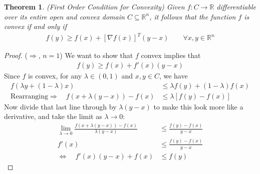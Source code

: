 \documentclass[12pt]{book}
\numberwithin{equation}{section} %
\theoremstyle{plain}
\newtheorem{thm}{Theorem}[section]
\theoremstyle{definition}
\theoremstyle{remark}
\newcommand{\R}{\mathbb{R}}
\newcommand{\Rn}{\mathbb{R}^n}
\begin{document}
\begin{thm}{\emph{(First Order Condition for Convexity)}}
\label{thm:diffconvex}
Given $f:C\rightarrow \R$ differentiable over its entire open and convex
domain $C\subseteq\Rn$, it follows that the function $f$ is convex if
and only if
\begin{align*}
  f(y) \geq f(x) + [\nabla f(x)]^T (y-x)
  \qquad\forall x,y\in\Rn
\end{align*}
\end{thm}
\begin{proof}
($\Rightarrow$, $n=1$) We want to show that $f$ convex implies that
\begin{align*}
  f(y) \geq f(x) + f'(x)(y-x)
\end{align*}
Since $f$ is convex, for any $\lambda\in(0,1)$ and $x,y\in C$, we have
\begin{align*}
  f(\lambda y + (1-\lambda)x)
  &\leq
  \lambda f(y) + (1-\lambda)f(x) \\
  \text{Rearranging} \Rightarrow \quad
  f(x + \lambda (y -x))
  - f(x)
  &\leq
  \lambda \left[f(y) - f(x) \right]
\end{align*}
Now divide that last line through by $\lambda(y-x)$ to make this look
more like a derivative, and take the limit as $\lambda\rightarrow 0$:
\begin{align*}
  \lim_{\lambda\rightarrow 0}
  \frac{f(x + \lambda (y -x)) - f(x)}{\lambda(y-x)}
  &\leq
  \frac{f(y) - f(x)}{y-x} \\
  f'(x)
  &\leq
  \frac{f(y) - f(x)}{y-x}\\
  \Leftrightarrow\quad
  f'(x)(y-x) + f(x)
  &\leq
  f(y)
\end{align*}


\end{proof}
\end{document}
